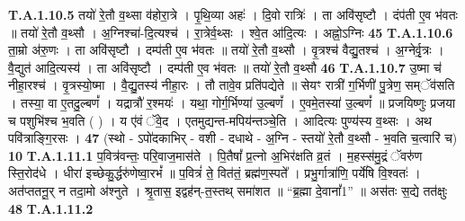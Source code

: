 \documentclass[17pt]{extarticle}
\begin{document}
                  \newline
                                                                  \textbf{ T.A.1.10.5} \newline
                  तयो॑ रे॒तौ व॒थ्सा व॑होरा॒त्रे । पृ॒थि॒व्या अहः॑ । दि॒वो रात्रिः॑ । ता अवि॑सृष्टौ । दंप॑ती ए॒व भ॑वतः ॥ तयो॑ रे॒तौ व॒थ्सौ । अ॒ग्निश्चा॑-दि॒त्यश्च॑ । रा॒त्रेर्व॒थ्सः । श्वे॒त आ॑दि॒त्यः । अह्नो॒ऽग्निः \textbf{ 45} \newline
                  \newline
                                                                  \textbf{ T.A.1.10.6} \newline
                  ता॒म्रो अ॑रु॒णः । ता अवि॑सृष्टौ । दम्प॑ती ए॒व भ॑वतः ॥ तयो॑ रे॒तौ व॒थ्सौ । वृ॒त्रश्च॑ वैद्यु॒तश्च॑ । अ॒ग्नेर्वृ॒त्रः । वै॒द्युत॑ आदि॒त्यस्य॑ ।  ता अवि॑सृष्टौ । दम्प॑ती ए॒व भ॑वतः ॥ तयो॑ रे॒तौ व॒थ्सौ \textbf{ 46} \newline
                  \newline
                                                                  \textbf{ T.A.1.10.7} \newline
                  उ॒ष्मा च॑ नीहा॒रश्च॑ । वृ॒त्रस्यो॒ष्मा । वै॒द्यु॒तस्य॑ नीहा॒रः । तौ तावे॒व प्रति॑पद्येते ॥ सेयꣳ रात्री॑ ग॒र्भिणी॑ पु॒त्रेण॒ सम्ॅव॑सति ।  तस्या॒ वा ए॒तदु॒ल्बणं᳚ । यद्रात्रौ॑ र॒श्मयः॑ । यथा॒ गोर्ग॒र्भिण्या॑ उ॒ल्बणं᳚ । ए॒वमे॒तस्या॑ उ॒ल्बणं᳚ ॥ प्रजयिष्णुः प्रजया च पशुभि॑श्च भ॒वति ( ) ।  य ए॑वं ॅवे॒द । एतमुद्यन्त-मपिय॑न्तञ्चे॒ति । आदित्यः पुण्य॑स्य व॒थ्सः । अथ पवि॑त्राङ्गि॒रसः । \textbf{ 47} \newline
                  \newline
                                                        (स्थो - ऽपो॑दकाभिर् - वशी - दधाथे - अ॒ग्नि - स्तयो॑ रे॒तौ व॒थ्सौ - भ॒वति च॒त्वारि॑ च) \textbf{10} \newline \newline
                                \textbf{ T.A.1.11.1} \newline
                  प॒वित्र॑वन्तः॒ परि॒वाज॒मास॑ते । पि॒तैषां᳚ प्र॒त्नो अ॒भिर॑क्षति व्र॒तं । म॒हस्स॑मु॒द्रं ॅवरु॑ण स्ति॒रोद॑धे । धीरा॑ इच्छेकु॒र्द्धरु॑णेष्वा॒रभं᳚ ॥  प॒वित्रं॑ ते॒ वित॑तं॒ ब्रह्म॑ण॒स्पते᳚ । प्रभु॒र्गात्रा॑णि॒ पर्ये॑षि वि॒श्वतः॑ ।  अत॑प्ततनू॒र् न तदा॒मो अ॑श्नुते । श्रृ॒तास॒ इद्वह॑न्-त॒स्तथ् समा॑शत ॥ “ब्र॒ह्मा दे॒वानां᳚{1}” ॥ अस॑तः स॒द्ये तत॑क्षुः \textbf{ 48} \newline
                  \newline
                                                                  \textbf{ T.A.1.11.2} \newline
\end{document}
